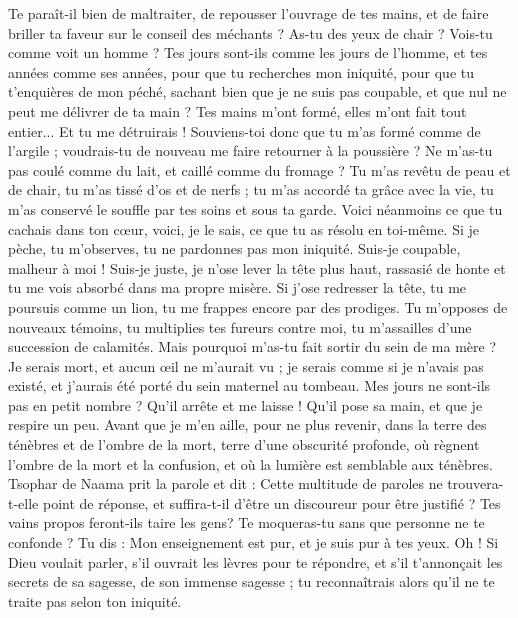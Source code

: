 \begin{multicols}{2}
Te paraît-il bien de maltraiter, de repousser l'ouvrage de tes mains, et de faire briller ta faveur sur le conseil des méchants ?
As-tu des yeux de chair ? Vois-tu comme voit un homme ?
Tes jours sont-ils comme les jours de l'homme, et tes années comme ses années,
pour que tu recherches mon iniquité, pour que tu t'enquières de mon péché,
sachant bien que je ne suis pas coupable, et que nul ne peut me délivrer de ta main ?
Tes mains m'ont formé, elles m'ont fait tout entier... Et tu me détruirais !
Souviens-toi donc que tu m'as formé comme de l'argile ; voudrais-tu de nouveau me faire retourner à la poussière ?
Ne m'as-tu pas coulé comme du lait, et caillé comme du fromage ?
Tu m'as revêtu de peau et de chair, tu m'as tissé d'os et de nerfs ;
tu m'as accordé ta grâce avec la vie, tu m'as conservé le souffle par tes soins et sous ta garde.
Voici néanmoins ce que tu cachais dans ton cœur, voici, je le sais, ce que tu as résolu en toi-même.
Si je pèche, tu m'observes, tu ne pardonnes pas mon iniquité.
Suis-je coupable, malheur à moi ! Suis-je juste, je n'ose lever la tête plus haut, rassasié de honte et tu me vois absorbé dans ma propre misère.
Si j'ose redresser la tête, tu me poursuis comme un lion, tu me frappes encore par des prodiges.
Tu m'opposes de nouveaux témoins, tu multiplies tes fureurs contre moi, tu m'assailles d'une succession de calamités.
Mais pourquoi m'as-tu fait sortir du sein de ma mère ? Je serais mort, et aucun œil ne m'aurait vu ;
je serais comme si je n’avais pas existé, et j'aurais été porté du sein maternel au tombeau.
Mes jours ne sont-ils pas en petit nombre ? Qu'il arrête et me laisse ! Qu'il pose sa main, et que je respire un peu.
Avant que je m'en aille, pour ne plus revenir, dans la terre des ténèbres et de l'ombre de la mort,
terre d'une obscurité profonde, où règnent l'ombre de la mort et la confusion, et où la lumière est semblable aux ténèbres.
\VerseOne{}Tsophar de Naama prit la parole et dit :
Cette multitude de paroles ne trouvera-t-elle point de réponse, et suffira-t-il d'être un discoureur pour être justifié ?
Tes vains propos feront-ils taire les gens?  Te moqueras-tu sans que personne ne te confonde ?
Tu dis : Mon enseignement est pur, et je suis pur à tes yeux.
Oh ! Si Dieu voulait parler, s'il ouvrait les lèvres pour te répondre,
et s'il t'annonçait les secrets de sa sagesse, de son immense sagesse ; tu reconnaîtrais alors qu'il ne te traite pas selon ton iniquité.

\end{multicols}
